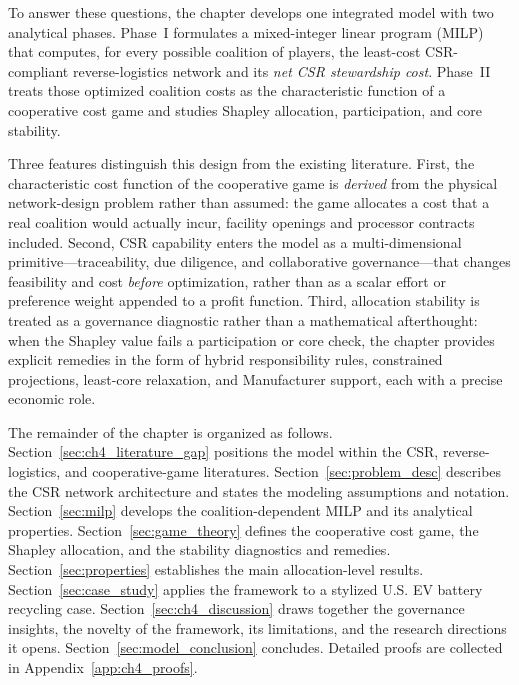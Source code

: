 To answer these questions, the chapter develops one integrated model with two analytical phases. Phase~I formulates a mixed-integer linear program (MILP) that computes, for every possible coalition of players, the least-cost CSR-compliant reverse-logistics network and its \emph{net CSR stewardship cost}. Phase~II treats those optimized coalition costs as the characteristic function of a cooperative cost game and studies Shapley allocation, participation, and core stability.

Three features distinguish this design from the existing literature. First, the characteristic cost function of the cooperative game is \emph{derived} from the physical network-design problem rather than assumed: the game allocates a cost that a real coalition would actually incur, facility openings and processor contracts included. Second, CSR capability enters the model as a multi-dimensional primitive---traceability, due diligence, and collaborative governance---that changes feasibility and cost \emph{before} optimization, rather than as a scalar effort or preference weight appended to a profit function. Third, allocation stability is treated as a governance diagnostic rather than a mathematical afterthought: when the Shapley value fails a participation or core check, the chapter provides explicit remedies in the form of hybrid responsibility rules, constrained projections, least-core relaxation, and Manufacturer support, each with a precise economic role.

The remainder of the chapter is organized as follows. Section~\ref{sec:ch4_literature_gap} positions the model within the CSR, reverse-logistics, and cooperative-game literatures. Section~\ref{sec:problem_desc} describes the CSR network architecture and states the modeling assumptions and notation. Section~\ref{sec:milp} develops the coalition-dependent MILP and its analytical properties. Section~\ref{sec:game_theory} defines the cooperative cost game, the Shapley allocation, and the stability diagnostics and remedies. Section~\ref{sec:properties} establishes the main allocation-level results. Section~\ref{sec:case_study} applies the framework to a stylized U.S. EV battery recycling case. Section~\ref{sec:ch4_discussion} draws together the governance insights, the novelty of the framework, its limitations, and the research directions it opens. Section~\ref{sec:model_conclusion} concludes. Detailed proofs are collected in Appendix~\ref{app:ch4_proofs}.

